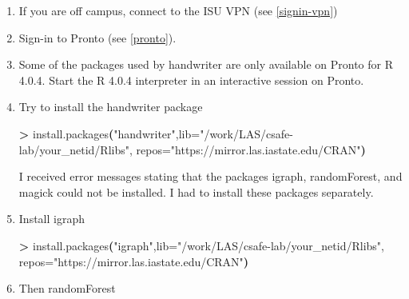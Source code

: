 \documentclass[
]{book}
\newenvironment{Shaded}{\begin{snugshade}}{\end{snugshade}}
\newcommand{\AttributeTok}[1]{\textcolor[rgb]{0.77,0.63,0.00}{#1}}
\newcommand{\ExtensionTok}[1]{#1}
\newcommand{\KeywordTok}[1]{\textcolor[rgb]{0.13,0.29,0.53}{\textbf{#1}}}
\newcommand{\NormalTok}[1]{#1}
\newcommand{\OperatorTok}[1]{\textcolor[rgb]{0.81,0.36,0.00}{\textbf{#1}}}
\newcommand{\StringTok}[1]{\textcolor[rgb]{0.31,0.60,0.02}{#1}}
\begin{document}
\begin{enumerate}
\def\labelenumi{\arabic{enumi}.}
\item
  If you are off campus, connect to the ISU VPN (see \ref{signin-vpn})
\item
  Sign-in to Pronto (see \ref{pronto}).
\item
  Some of the packages used by handwriter are only available on Pronto for R 4.0.4. Start the R 4.0.4 interpreter in an interactive session on Pronto.

\begin{Shaded}
\end{Shaded}
\item
  Try to install the handwriter package

\begin{Shaded}
\begin{Highlighting}[]
\OperatorTok{\textgreater{}}\NormalTok{ install.packages}\KeywordTok{(}\StringTok{"handwriter"}\ExtensionTok{,lib=}\StringTok{"/work/LAS/csafe{-}lab/your\_netid/Rlibs"}\ExtensionTok{,}\NormalTok{ repos=}\StringTok{"https://mirror.las.iastate.edu/CRAN"}\KeywordTok{)}
\end{Highlighting}
\end{Shaded}

  I received error messages stating that the packages igraph, randomForest, and magick could not be installed. I had to install these packages separately.
\item
  Install igraph

\begin{Shaded}
\begin{Highlighting}[]
\OperatorTok{\textgreater{}}\NormalTok{ install.packages}\KeywordTok{(}\StringTok{"igraph"}\ExtensionTok{,lib=}\StringTok{"/work/LAS/csafe{-}lab/your\_netid/Rlibs"}\ExtensionTok{,}\NormalTok{ repos=}\StringTok{"https://mirror.las.iastate.edu/CRAN"}\KeywordTok{)}
\end{Highlighting}
\end{Shaded}
\item
  Then randomForest


\end{enumerate}
\end{document}
